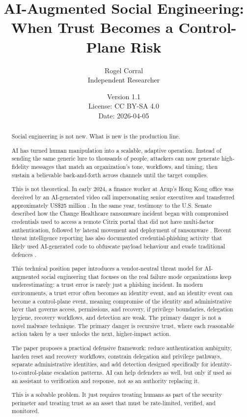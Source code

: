 \documentclass[11pt]{article}
\title{AI-Augmented Social Engineering: When Trust Becomes a Control-Plane Risk}
\author{Rogel Corral\\Independent Researcher}
\date{Version 1.1\\License: CC BY-SA 4.0\\Date: 2026-04-05}
\begin{document}
\maketitle

\begin{abstract}
Social engineering is not new. What is new is the production line.

AI has turned human manipulation into a scalable, adaptive operation. Instead of sending the same generic lure to thousands of people, attackers can now generate high-fidelity messages that match an organization’s tone, workflows, and timing, then sustain a believable back-and-forth across channels until the target complies.

This is not theoretical. In early 2024, a finance worker at Arup’s Hong Kong office was deceived by an AI-generated video call impersonating senior executives and transferred approximately US\$25 million \cite{milmo2024}. In the same year, testimony to the U.S. Senate described how the Change Healthcare ransomware incident began with compromised credentials used to access a remote Citrix portal that did not have multi-factor authentication, followed by lateral movement and deployment of ransomware \cite{witty2024}. Recent threat intelligence reporting has also documented credential-phishing activity that likely used AI-generated code to obfuscate payload behaviour and evade traditional defences \cite{microsoft2025}.

This technical position paper introduces a vendor-neutral threat model for AI-augmented social engineering that focuses on the real failure mode organizations keep underestimating: a trust error is rarely just a phishing incident. In modern environments, a trust error often becomes an identity event, and an identity event can become a control-plane event, meaning compromise of the identity and administrative layer that governs access, permissions, and recovery, if privilege boundaries, delegation hygiene, recovery workflows, and detection are weak. The primary danger is not a novel malware technique. The primary danger is recursive trust, where each reasonable action taken by a user unlocks the next, higher-impact action.

The paper proposes a practical defensive framework: reduce authentication ambiguity, harden reset and recovery workflows, constrain delegation and privilege pathways, separate administrative identities, and add detection designed specifically for identity-to-control-plane escalation patterns. AI can help defenders as well, but only if used as an assistant to verification and response, not as an authority replacing it.

This is a solvable problem. It just requires treating humans as part of the security perimeter and treating trust as an asset that must be rate-limited, verified, and monitored.
\end{abstract}
\end{document}
